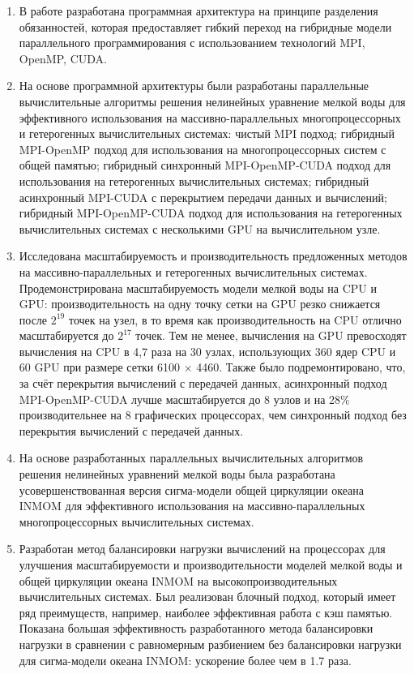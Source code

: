 \begin{enumerate}
\item В работе разработана программная архитектура на принципе разделения обязанностей, которая предоставляет гибкий переход на гибридные модели параллельного программирования с использованием технологий MPI, OpenMP, CUDA.
\item На основе программной архитектуры были разработаны параллельные вычислительные алгоритмы решения нелинейных уравнение мелкой воды для эффективного использования на массивно-параллельных многопроцессорных и гетерогенных вычислительных системах:
чистый MPI подход;
гибридный MPI-OpenMP подход для использования на многопроцессорных систем с общей памя­тью;
гибридный синхронный MPI-OpenMP-CUDA подход для использования на гетерогенных вычислительных системах;
гибридный асинхронный MPI-CUDA с перекрытием передачи данных и вычислений;
гибридный MPI-OpenMP-CUDA подход для использования на гетерогенных вычислительных системах с несколькими GPU на вычислительном узле.
\item Исследована масштабируемость и производительность предложенных методов на массивно-параллельных и гетерогенных вычислительных системах. Продемонстрирована масштабируемость модели мелкой воды на CPU и GPU: производительность на одну точку сетки на GPU резко снижается после $2^{19}$ точек на узел, в то время как производительность на CPU отлично масштабируется до $2^{17}$ точек. Тем не менее, вычисления на GPU превосходят вычисления на CPU в 4,7 раза на 30 узлах, использующих 360 ядер CPU и 60 GPU при размере сетки 6100 $\times$ 4460. Также было подремонтировано, что, за счёт перекрытия вычислений с передачей данных, асинхронный подход MPI-OpenMP-CUDA лучше масштабируется до 8 узлов и на 28\% производительнее на 8 графических процессорах, чем синхронный подход без перекрытия вычислений с передачей данных.
\item На основе разработанных параллельных вычислительных алгоритмов решения нелинейных уравнений мелкой воды была разработана усовершенствованная версия сигма-модели общей циркуляции океана INMOM для эффективного использования на массивно-параллельных многопроцессорных вычислительных системах.
\item Разработан метод балансировки нагрузки вычислений на процессорах для улучшения масштабируемости и производительности моделей мелкой воды и общей циркуляции океана INMOM на высокопроизводительных вычислительных системах. Был реализован блочный подход, который имеет ряд преимуществ, например, наиболее эффективная работа с кэш памятью. Показана большая эффективность разработанного метода балансировки нагрузки в сравнении с равномерным разбиением без балансировки нагрузки для сигма-модели океана INMOM: ускорение более чем в 1.7 раза.
\end{enumerate}
